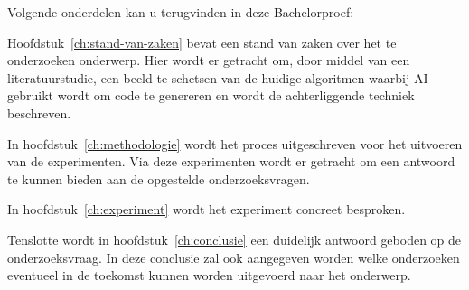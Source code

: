 Volgende onderdelen kan u terugvinden in deze Bachelorproef:

Hoofdstuk~\ref{ch:stand-van-zaken} bevat een stand van zaken over het te onderzoeken onderwerp. Hier wordt er getracht om, door middel van een literatuurstudie, een beeld te schetsen van de huidige algoritmen waarbij AI gebruikt wordt om code te genereren en wordt de achterliggende techniek beschreven.

In hoofdstuk~\ref{ch:methodologie} wordt het proces uitgeschreven voor het uitvoeren van de experimenten. Via deze experimenten wordt er getracht om een antwoord te kunnen bieden aan de opgestelde onderzoeksvragen.

In hoofdstuk~\ref{ch:experiment} wordt het experiment concreet besproken.

Tenslotte wordt in hoofdstuk~\ref{ch:conclusie} een duidelijk antwoord geboden op de onderzoeksvraag. In deze conclusie zal ook aangegeven worden welke onderzoeken eventueel in de toekomst kunnen worden uitgevoerd naar het onderwerp.